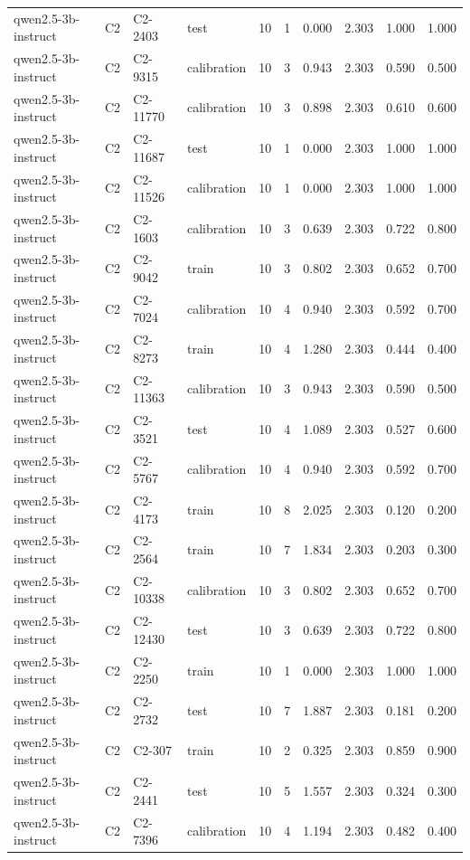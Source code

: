 \begin{table}
\begin{tabular}{llllrrrrrr}
qwen2.5-3b-instruct & C2 & C2-2403 & test & 10 & 1 & 0.000 & 2.303 & 1.000 & 1.000 \\
qwen2.5-3b-instruct & C2 & C2-9315 & calibration & 10 & 3 & 0.943 & 2.303 & 0.590 & 0.500 \\
qwen2.5-3b-instruct & C2 & C2-11770 & calibration & 10 & 3 & 0.898 & 2.303 & 0.610 & 0.600 \\
qwen2.5-3b-instruct & C2 & C2-11687 & test & 10 & 1 & 0.000 & 2.303 & 1.000 & 1.000 \\
qwen2.5-3b-instruct & C2 & C2-11526 & calibration & 10 & 1 & 0.000 & 2.303 & 1.000 & 1.000 \\
qwen2.5-3b-instruct & C2 & C2-1603 & calibration & 10 & 3 & 0.639 & 2.303 & 0.722 & 0.800 \\
qwen2.5-3b-instruct & C2 & C2-9042 & train & 10 & 3 & 0.802 & 2.303 & 0.652 & 0.700 \\
qwen2.5-3b-instruct & C2 & C2-7024 & calibration & 10 & 4 & 0.940 & 2.303 & 0.592 & 0.700 \\
qwen2.5-3b-instruct & C2 & C2-8273 & train & 10 & 4 & 1.280 & 2.303 & 0.444 & 0.400 \\
qwen2.5-3b-instruct & C2 & C2-11363 & calibration & 10 & 3 & 0.943 & 2.303 & 0.590 & 0.500 \\
qwen2.5-3b-instruct & C2 & C2-3521 & test & 10 & 4 & 1.089 & 2.303 & 0.527 & 0.600 \\
qwen2.5-3b-instruct & C2 & C2-5767 & calibration & 10 & 4 & 0.940 & 2.303 & 0.592 & 0.700 \\
qwen2.5-3b-instruct & C2 & C2-4173 & train & 10 & 8 & 2.025 & 2.303 & 0.120 & 0.200 \\
qwen2.5-3b-instruct & C2 & C2-2564 & train & 10 & 7 & 1.834 & 2.303 & 0.203 & 0.300 \\
qwen2.5-3b-instruct & C2 & C2-10338 & calibration & 10 & 3 & 0.802 & 2.303 & 0.652 & 0.700 \\
qwen2.5-3b-instruct & C2 & C2-12430 & test & 10 & 3 & 0.639 & 2.303 & 0.722 & 0.800 \\
qwen2.5-3b-instruct & C2 & C2-2250 & train & 10 & 1 & 0.000 & 2.303 & 1.000 & 1.000 \\
qwen2.5-3b-instruct & C2 & C2-2732 & test & 10 & 7 & 1.887 & 2.303 & 0.181 & 0.200 \\
qwen2.5-3b-instruct & C2 & C2-307 & train & 10 & 2 & 0.325 & 2.303 & 0.859 & 0.900 \\
qwen2.5-3b-instruct & C2 & C2-2441 & test & 10 & 5 & 1.557 & 2.303 & 0.324 & 0.300 \\
qwen2.5-3b-instruct & C2 & C2-7396 & calibration & 10 & 4 & 1.194 & 2.303 & 0.482 & 0.400 \\

\end{tabular}
\end{table}
